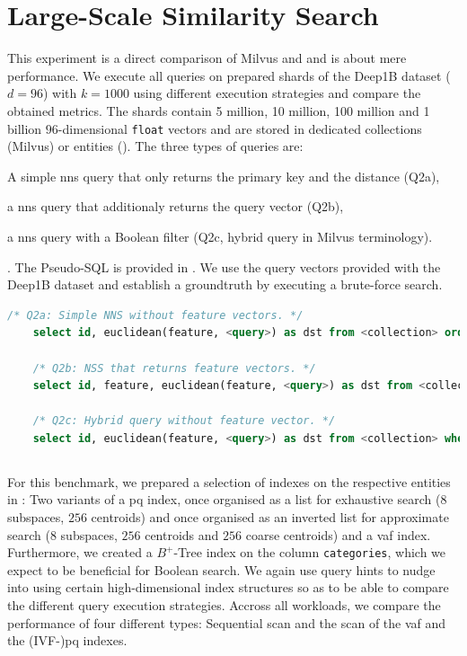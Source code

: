 \section{Large-Scale Similarity Search}
This experiment is a direct comparison of Milvus and \cottontail{} and is about mere performance. We execute all queries on prepared shards of the Deep1B \cite{Babenko:2016Efficient} dataset ($d=96$) with $k=1000$ using different execution strategies and compare the obtained metrics. The shards contain 5 million, 10 million, 100 million and 1 billion $96$-dimensional \texttt{float} vectors and are stored in dedicated collections (Milvus) or entities (\cottontail). The three types of queries are:
\begin{enumerate*}[label=(\roman*)]
    \item A simple \acrshort{nns} query that only returns the primary key and the distance (Q2a),
    \item a \acrshort{nns} query that additionaly returns the query vector (Q2b),
    \item a \acrshort{nns} query with a Boolean filter (Q2c, hybrid query in Milvus terminology).
\end{enumerate*}. The Pseudo-SQL is provided in . We use the query vectors provided with the Deep1B dataset and establish a groundtruth by executing a brute-force search.

\begin{lstlisting}[language=SQL, caption={Pseudo-SQL of the queries executed for this measurement.}, label=listing:big_nns_query, numbers=none]
    /* Q2a: Simple NNS without feature vectors. */
    select id, euclidean(feature, <query>) as dst from <collection> order by dst limit 1000
    
    /* Q2b: NSS that returns feature vectors. */
    select id, feature, euclidean(feature, <query>) as dst from <collection> order by dst limit 1000

    /* Q2c: Hybrid query without feature vector. */
    select id, euclidean(feature, <query>) as dst from <collection> where category = <category> order by dst limit 1000
\end{lstlisting}

\subsection{\cottontail}
\label{section:evaluation_bignns_cottontail}
For this benchmark, we prepared a selection of indexes on the respective entities in \cottontail{}: Two variants of a \acrshort{pq} index, once organised as a list for exhaustive search ($8$ subspaces, $256$ centroids) and once organised as an inverted list for approximate search ($8$ subspaces, $256$ centroids and $256$ coarse centroids) and a \acrshort{vaf} index. Furthermore, we created a $B^{+}$-Tree index on the column \texttt{categories}, which we expect to be beneficial for Boolean search. We again use query hints to nudge \cottontail{} into using certain high-dimensional index structures so as to be able to compare the different query execution strategies. Accross all workloads, we compare the performance of four different types: Sequential scan and the scan of the \acrshort{vaf} and the (IVF-)\acrshort{pq} indexes.

